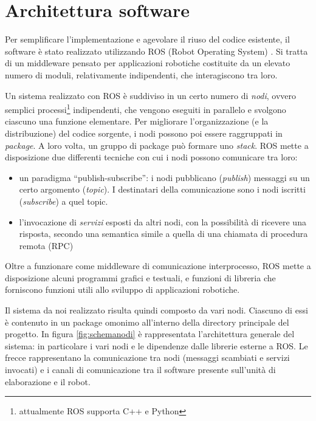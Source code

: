 \chapter{Architettura software}
\label{cap:architetturasw}

Per semplificare l'implementazione e agevolare il riuso del codice esistente, il software è stato realizzato utilizzando ROS (Robot Operating System) \cite{rosweb}. Si tratta di un middleware pensato per applicazioni robotiche costituite da un elevato numero di moduli, relativamente indipendenti, che interagiscono tra loro.

Un sistema realizzato con ROS è suddiviso in un certo numero di \emph{nodi}, ovvero semplici processi\footnote{attualmente ROS supporta C++ e Python} indipendenti, che vengono eseguiti in parallelo e svolgono ciascuno una funzione elementare. Per migliorare l'organizzazione (e la distribuzione) del codice sorgente, i nodi possono poi essere raggruppati in \emph{package}. A loro volta, un gruppo di package può formare uno \emph{stack}. ROS mette a disposizione due differenti tecniche con cui i nodi possono comunicare tra loro:
\begin{itemize}
 \item un paradigma ``publish-subscribe'': i nodi pubblicano (\emph{publish}) messaggi su un certo argomento (\emph{topic}). I destinatari della comunicazione sono i nodi iscritti (\emph{subscribe}) a quel topic.
 \item l'invocazione di \emph{servizi} esposti da altri nodi, con la possibilità di ricevere una risposta, secondo una semantica simile a quella di una chiamata di procedura remota (RPC)
\end{itemize}

Oltre a funzionare come middleware di comunicazione interprocesso, ROS mette a disposizione alcuni programmi grafici e testuali, e funzioni di libreria che forniscono funzioni utili allo sviluppo di applicazioni robotiche.

Il sistema da noi realizzato risulta quindi composto da vari nodi. Ciascuno di essi è contenuto in un package omonimo all'interno della directory principale del progetto. In figura \ref{fig:schemanodi} è rappresentata l'architettura generale del sistema: in particolare i vari nodi e le dipendenze dalle librerie esterne a ROS. Le frecce rappresentano la comunicazione tra nodi (messaggi scambiati e servizi invocati) e i canali di comunicazione tra il software presente sull'unità di elaborazione e il robot.

